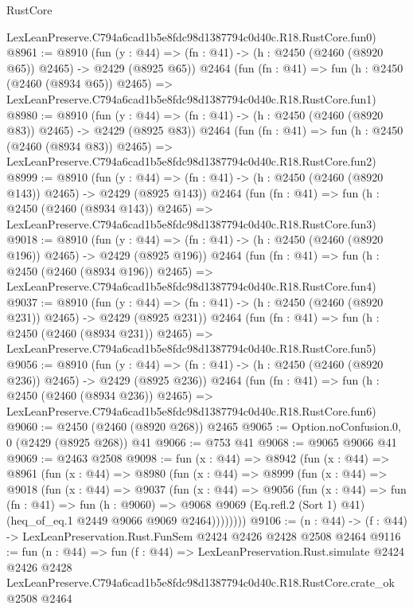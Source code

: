 \begin{lexlean}{RustCore}
\begin{coremodule}
    LexLeanPreserve.C794a6cad1b5e8fdc98d1387794c0d40c.R18.RustCore.fun0)
@8961 := @8910
    (fun (y : @44) => (fn : @41) -> (h : @2450 (@2460 (@8920 @65)) @2465) -> @2429 (@8925 @65))
    @2464
    (fun (fn : @41) =>
    fun (h : @2450 (@2460 (@8934 @65)) @2465) =>
    LexLeanPreserve.C794a6cad1b5e8fdc98d1387794c0d40c.R18.RustCore.fun1)
@8980 := @8910
    (fun (y : @44) => (fn : @41) -> (h : @2450 (@2460 (@8920 @83)) @2465) -> @2429 (@8925 @83))
    @2464
    (fun (fn : @41) =>
    fun (h : @2450 (@2460 (@8934 @83)) @2465) =>
    LexLeanPreserve.C794a6cad1b5e8fdc98d1387794c0d40c.R18.RustCore.fun2)
@8999 := @8910
    (fun (y : @44) => (fn : @41) -> (h : @2450 (@2460 (@8920 @143)) @2465) -> @2429 (@8925 @143))
    @2464
    (fun (fn : @41) =>
    fun (h : @2450 (@2460 (@8934 @143)) @2465) =>
    LexLeanPreserve.C794a6cad1b5e8fdc98d1387794c0d40c.R18.RustCore.fun3)
@9018 := @8910
    (fun (y : @44) => (fn : @41) -> (h : @2450 (@2460 (@8920 @196)) @2465) -> @2429 (@8925 @196))
    @2464
    (fun (fn : @41) =>
    fun (h : @2450 (@2460 (@8934 @196)) @2465) =>
    LexLeanPreserve.C794a6cad1b5e8fdc98d1387794c0d40c.R18.RustCore.fun4)
@9037 := @8910
    (fun (y : @44) => (fn : @41) -> (h : @2450 (@2460 (@8920 @231)) @2465) -> @2429 (@8925 @231))
    @2464
    (fun (fn : @41) =>
    fun (h : @2450 (@2460 (@8934 @231)) @2465) =>
    LexLeanPreserve.C794a6cad1b5e8fdc98d1387794c0d40c.R18.RustCore.fun5)
@9056 := @8910
    (fun (y : @44) => (fn : @41) -> (h : @2450 (@2460 (@8920 @236)) @2465) -> @2429 (@8925 @236))
    @2464
    (fun (fn : @41) =>
    fun (h : @2450 (@2460 (@8934 @236)) @2465) =>
    LexLeanPreserve.C794a6cad1b5e8fdc98d1387794c0d40c.R18.RustCore.fun6)
@9060 := @2450 (@2460 (@8920 @268)) @2465
@9065 := Option.noConfusion.{0, 0} (@2429 (@8925 @268)) @41
@9066 := @753 @41
@9068 := @9065 @9066 @41
@9069 := @2463 @2508
@9098 := fun (x : @44) =>
  @8942
    (fun (x : @44) =>
    @8961
      (fun (x : @44) =>
      @8980
        (fun (x : @44) =>
        @8999
          (fun (x : @44) =>
          @9018
            (fun (x : @44) =>
            @9037
              (fun (x : @44) =>
              @9056
                (fun (x : @44) =>
                fun (fn : @41) =>
                fun (h : @9060) =>
                @9068
                  @9069
                  (Eq.refl.{2} (Sort 1) @41)
                  (heq_of_eq.{1} @2449 @9066 @9069 @2464))))))))
@9106 := (n : @44) -> (f : @44) -> LexLeanPreservation.Rust.FunSem @2424 @2426 @2428 @2508 @2464
@9116 := fun (n : @44) =>
  fun (f : @44) =>
  LexLeanPreservation.Rust.simulate
    @2424
    @2426
    @2428
    LexLeanPreserve.C794a6cad1b5e8fdc98d1387794c0d40c.R18.RustCore.crate_ok
    @2508
    @2464
\end{coremodule}
\end{lexlean}
